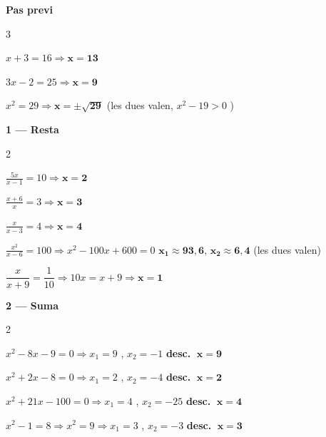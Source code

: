 \documentclass[12pt,a4paper]{article}
\begin{document}
\noindent\textbf{Pas previ}

\begin{multicols}{3}
\begin{exercicis}
    \item $x+3=16 \Rightarrow \boldsymbol{x=13}$
    \item $3x-2=25 \Rightarrow \boldsymbol{x=9}$
    \item $x^2=29 \Rightarrow \boldsymbol{x=\pm\sqrt{29}}$ \newline (les dues valen, $x^2-19>0$ \checkmark)
\end{exercicis}
\end{multicols}

\vspace{0.25cm}

\noindent\textbf{1 --- Resta}

\begin{multicols}{2}
\begin{exercicis}
    \item $\frac{5x}{x-1}=10 \Rightarrow \boldsymbol{x=2}$ \checkmark
    \item $\frac{x+6}{x}=3 \Rightarrow \boldsymbol{x=3}$ \checkmark
    \item $\frac{x}{x-3}=4 \Rightarrow \boldsymbol{x=4}$ \checkmark
    \item $\frac{x^2}{x-6}=100 \Rightarrow x^2-100x+600=0$ \newline
          $\boldsymbol{x_1\approx93{,}6}$, $\boldsymbol{x_2\approx6{,}4}$ (les dues valen)
    \item $\dfrac{x}{x+9}=\dfrac{1}{10}\Rightarrow 10x=x+9\Rightarrow \boldsymbol{x=1}$ \checkmark
\end{exercicis}
\end{multicols}

\vspace{0.25cm}

\noindent\textbf{2 --- Suma}

\begin{multicols}{2}
\begin{exercicis}
    \item $x^2-8x-9=0\Rightarrow x_1=9$ \checkmark, $x_2=-1$ \textbf{desc.} $\;\boldsymbol{x=9}$
    \item $x^2+2x-8=0\Rightarrow x_1=2$ \checkmark, $x_2=-4$ \textbf{desc.} $\;\boldsymbol{x=2}$
    \item $x^2+21x-100=0\Rightarrow x_1=4$ \checkmark, $x_2=-25$ \textbf{desc.} $\;\boldsymbol{x=4}$
    \item $x^2-1=8\Rightarrow x^2=9\Rightarrow x_1=3$ \checkmark, $x_2=-3$ \textbf{desc.} $\;\boldsymbol{x=3}$
\end{exercicis}
\end{multicols}
\end{document}

